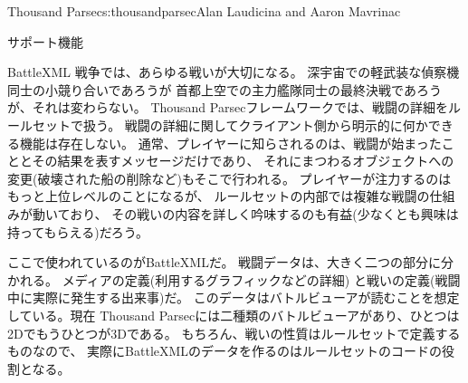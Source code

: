 \begin{aosachapter}{Thousand Parsec}{s:thousandparsec}{Alan Laudicina and Aaron Mavrinac}
\begin{aosasect1}{サポート機能}
\begin{aosasect2}{BattleXML}
戦争では、あらゆる戦いが大切になる。
深宇宙での軽武装な偵察機同士の小競り合いであろうが
首都上空での主力艦隊同士の最終決戦であろうが、それは変わらない。
Thousand Parsecフレームワークでは、戦闘の詳細をルールセットで扱う。
戦闘の詳細に関してクライアント側から明示的に何かできる機能は存在しない。
通常、プレイヤーに知らされるのは、戦闘が始まったこととその結果を表すメッセージだけであり、
それにまつわるオブジェクトへの変更(破壊された船の削除など)もそこで行われる。
プレイヤーが注力するのはもっと上位レベルのことになるが、
ルールセットの内部では複雑な戦闘の仕組みが動いており、
その戦いの内容を詳しく吟味するのも有益(少なくとも興味は持ってもらえる)だろう。

ここで使われているのがBattleXMLだ。
戦闘データは、大きく二つの部分に分かれる。
メディアの定義(利用するグラフィックなどの詳細)
と戦いの定義(戦闘中に実際に発生する出来事)だ。
このデータはバトルビューアが読むことを想定している。現在
Thousand Parsecには二種類のバトルビューアがあり、ひとつは2Dでもうひとつが3Dである。
もちろん、戦いの性質はルールセットで定義するものなので、
実際にBattleXMLのデータを作るのはルールセットのコードの役割となる。


\end{aosasect2}
\end{aosasect1}
\end{aosachapter}
